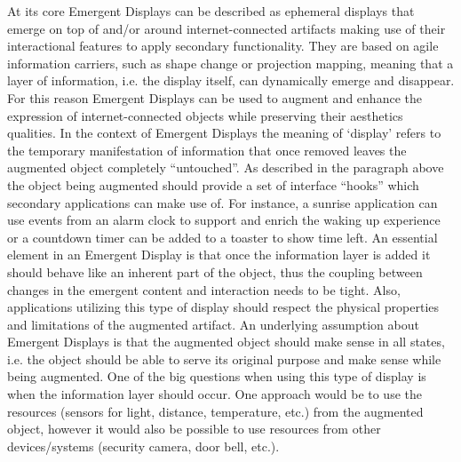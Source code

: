 At its core Emergent Displays can be described as ephemeral displays that emerge on top of and/or around internet-connected artifacts making use of their interactional features to apply secondary functionality. They are based on agile information carriers, such as shape change or projection mapping, meaning that a layer of information, i.e. the display itself, can dynamically emerge and disappear. For this reason Emergent Displays can be used to augment and enhance the expression of internet-connected objects while preserving their aesthetics qualities. In the context of Emergent Displays the meaning of ‘display’ refers to the temporary manifestation of information that once removed leaves the augmented object completely “untouched”. As described in the paragraph above the object being augmented should provide a set of interface “hooks” which secondary applications can make use of. For instance, a sunrise application can use events from an alarm clock to support and enrich the waking up experience or a countdown timer can be added to a toaster to show time left. An essential element in an Emergent Display is that once the information layer is added it should behave like an inherent part of the object, thus the coupling between changes in the emergent content and interaction needs to be tight. Also, applications utilizing this type of display should respect the physical properties and limitations of the augmented artifact. An underlying assumption about Emergent Displays is that the augmented object should make sense in all states, i.e. the object should be able to serve its original purpose and make sense while being augmented. One of the big questions when using this type of display is when the information layer should occur. One approach would be to use the resources (sensors for light, distance, temperature, etc.) from the augmented object, however it would also be possible to use resources from other devices/systems (security camera, door bell, etc.).

